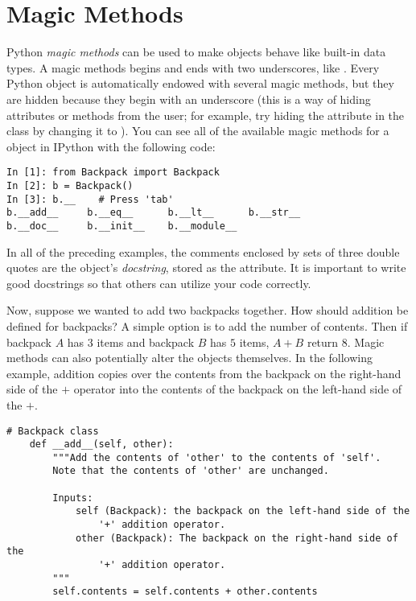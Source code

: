 \section*{Magic Methods}

Python \emph{magic methods} can be used to make objects behave like built-in data types.
A magic methods begins and ends with two underscores, like .
Every Python object is automatically endowed with several magic methods, but they are hidden because they begin with an underscore (this is a way of hiding attributes or methods from the user; for example, try hiding the  attribute in the  class by changing it to ).
You can see all of the available magic methods for a  object in IPython with the following code:

\begin{lstlisting}
In [1]: from Backpack import Backpack
In [2]: b = Backpack()
In [3]: b.__	# Press 'tab'
b.__add__     b.__eq__      b.__lt__      b.__str__     
b.__doc__     b.__init__    b.__module__  
\end{lstlisting}

\begin{info}
In all of the preceding examples, the comments enclosed by sets of three double quotes are the object's \emph{docstring}, stored as the  attribute.
It is important to write good docstrings so that others can utilize your code correctly.
\end{info}

Now, suppose we wanted to add two backpacks together.
How should addition be defined for backpacks?
A simple option is to add the number of contents.
Then if backpack $A$ has $3$ items and backpack $B$ has $5$ items, $A + B$ return $8$.
Magic methods can also potentially alter the objects themselves.
In the following example, addition copies over the contents from the backpack on the right-hand side of the $+$ operator into the contents of the backpack on the left-hand side of the $+$.

\begin{lstlisting}
# Backpack class
    def __add__(self, other):
        """Add the contents of 'other' to the contents of 'self'.
        Note that the contents of 'other' are unchanged.
        
        Inputs:
            self (Backpack): the backpack on the left-hand side of the
                '+' addition operator.
            other (Backpack): The backpack on the right-hand side of the
                '+' addition operator.
        """
        self.contents = self.contents + other.contents
\end{lstlisting}

